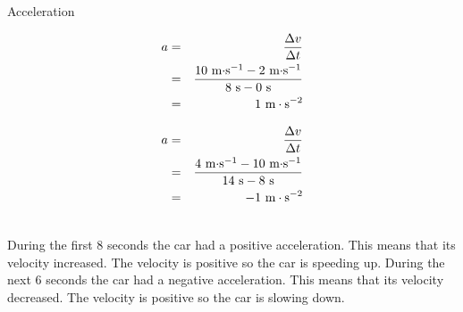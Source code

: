 \begin{wex}{Acceleration}
{
\begin{minipage}{0.5\textwidth}
\begin{eqnarray*}
a &=& \frac{\Delta v}{\Delta t}\\
&=& \frac{10\textrm{ m$\cdot$s$^{-1}$} - 2\textrm{ m$\cdot$s$^{-1}$}}{8\textrm{ s} - 0\textrm{ s}}\\
&=& 1~\text{m}\cdot \text{s}^{-2}
\end{eqnarray*}
\end{minipage}
\begin{minipage}{0.5\textwidth}
\begin{eqnarray*}
a &=& \frac{\Delta v}{\Delta t}\\
&=& \frac{4\textrm{ m$\cdot$s$^{-1}$} - 10\textrm{ m$\cdot$s$^{-1}$}}{14\textrm{ s} - 8\textrm{ s}}\\
&=& -1~\text{m}\cdot \text{s}^{-2}
\end{eqnarray*}
\end{minipage}\\
During the first 8 seconds the car had a positive acceleration. This means that its velocity increased. The velocity is positive so the car is speeding up.
During the next 6 seconds the car had a negative acceleration. This means that its velocity decreased. The velocity is positive so the car is slowing down.}
\end{wex}
    \noindent
\label{m38794*secfhsst!!!underscore!!!id1815}
